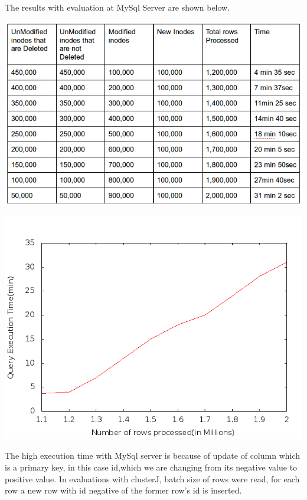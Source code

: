 The results with evaluation at MySql Server are shown below.\\
\begin{center}
\includegraphics[scale=0.65]{figs/preliminar/MySqlServerSingleSnapshotEval.png}
\label{fig:MySqlServerSSE}%
\end{center}

\pagebreak

\begin{center}
\includegraphics[scale=0.65]{figs/preliminar/MySqlServerSingleSnapshotEvalGraph.png}
\label{fig:MySqlServerSSEGraph}%
\end{center}

The high execution time with MySql server is because of update of column which is a primary key, in this case id,which we are changing from its negative value to positive value. In evaluations with clusterJ, batch size of rows were read, for each row a new row with id negative of the former row's id is inserted. 

